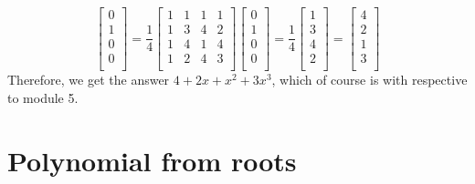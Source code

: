 \documentclass[11pt]{article}
\newenvironment{qparts}{\begin{enumerate}[{(}a{)}]}{\end{enumerate}}
\begin{document}
\begin{qparts}
\[		\begin{bmatrix} 
			0 \\ 
			1 \\ 
			0 \\ 
			0 \\ 
		\end{bmatrix}
		=
		\frac{1}{4}
		\begin{bmatrix} 
			1 & 1 & 1 & 1 \\ 
			1 & 3 & 4 & 2 \\ 
			1 & 4 & 1 & 4 \\ 
			1 & 2 & 4 & 3 \\ 
		\end{bmatrix}		
		\begin{bmatrix} 
			0 \\ 
			1 \\ 
			0 \\ 
			0 \\ 
		\end{bmatrix}
		=
		\frac{1}{4}
		\begin{bmatrix} 
			1 \\ 
			3 \\ 
			4 \\ 
			2 \\ 
		\end{bmatrix}
		=
		\begin{bmatrix} 
			4 \\ 
			2 \\ 
			1 \\ 
			3 \\ 
		\end{bmatrix} 
	\]
	Therefore, we get the answer $4 + 2x + x^2 + 3x^3$, which of course is with respective to module 5.
\end{qparts}

\newpage
\section{Polynomial from roots}
\end{document}
